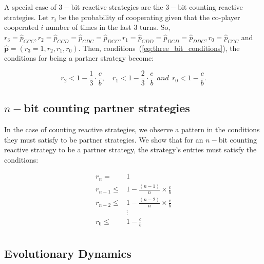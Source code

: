 \documentclass{article}
\theoremstyle{definition}
\begin{document}
A special case of $3-$bit reactive strategies are the $3-$bit counting reactive
strategies. Let $r_i$ be the probability of cooperating given that the co-player
cooperated $i$ number of times in the last 3 turns. So, $r_3 = \hat{p}_{CCC},
r_2 = \hat{p}_{CCD} =  \hat{p}_{CDC} = \hat{p}_{DCC}, r_1 = \hat{p}_{CDD} =
\hat{p}_{DCD} =  \hat{p}_{DDC}, r_0 = \hat{p}_{CCC}$ and $\mathbf{\hat{p}}=(r_3=1,
r_2, r_1, r_0)$. Then, conditions~(\ref{eq:three_bit_conditions}), the
conditions for being a partner strategy become:

\begin{equation}\label{eq:counting_three_bit_conditions}
  \displaystyle r_2 < 1- \frac{1}{3} \cdot \frac{c}{b}, \quad r_1 < 1- \frac{2}{3} \cdot \frac{c}{b} ~~and~~ r_0 < 1\!-\! \frac{c}{b}.
\end{equation}


\subsection{$n-$bit counting partner strategies}

In the case of counting reactive strategies, we observe a pattern in the
conditions they must satisfy to be partner strategies. We show that for an $n-$bit
counting reactive strategy to be a partner strategy, the strategy's entries must
satisfy the conditions:

\begin{align*}
    r_{n}   = & 1 \\
    r_{n-1} \leq & 1  - \frac{(n - 1)}{n} \times \frac{c}{b}\\
    r_{n-2} \leq & 1  - \frac{(n - 2)}{n} \times \frac{c}{b}\\
    & \vdots \\
    r_{0} \leq &  1  - \frac{c}{b}\\
\end{align*}

\subsection{Evolutionary Dynamics}
\end{document}
